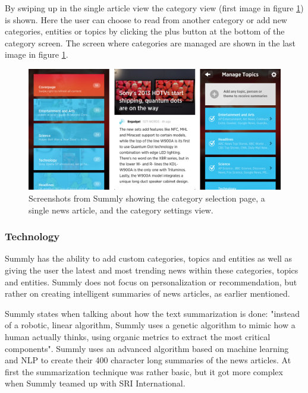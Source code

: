 By swiping up in the single article view the category view (first image in figure \ref{screenshots_summly}) is shown. Here the user can choose to read from another category or add new categories, entities or topics by clicking the plus button at the bottom of the category screen. The screen where categories are managed are shown in the last image in figure \ref{screenshots_summly}.

\begin{figure}[!htbp]
\centering
\includegraphics[width=130mm]{GFX/screenshots/summly.png}
\caption{Screenshots from Summly showing the category selection page, a single news article, and the category settings view.}
\label{screenshots_summly}
\end{figure}

\subsubsection{Technology}

Summly has the ability to add custom categories, topics and entities as well as giving the user the latest and most trending news within these categories, topics and entities. Summly does not focus on personalization or recommendation, but rather on creating intelligent summaries of news articles, as earlier mentioned. 

Summly states when talking about how the text summarization is done: "instead of a robotic, linear algorithm, Summly uses a genetic algorithm to mimic how a human actually thinks, using organic metrics to extract the most critical components"\cite{summly_launch_video}. Summly uses an advanced algorithm based on machine learning and NLP to create their 400 character long summaries of the news articles. At first the summarization technique was rather basic, but it got more complex when Summly teamed up with SRI International\cite{summly_technology}.


